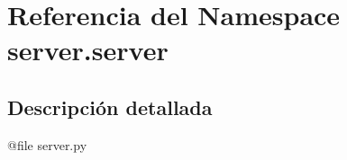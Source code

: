 \hypertarget{namespaceserver_1_1server}{\section{Referencia del Namespace server.\-server}
\label{namespaceserver_1_1server}
}


\subsection{Descripción detallada}
\begin{DoxyVerb}@file server.py \end{DoxyVerb}
 